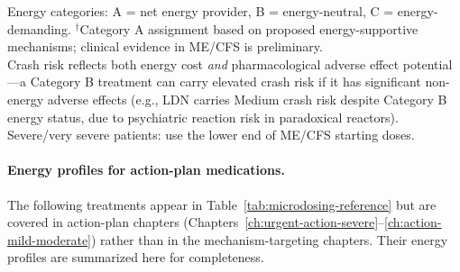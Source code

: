 \begin{table}[htbp]
\medskip
\footnotesize
Energy categories: A = net energy provider, B = energy-neutral, C = energy-demanding. $^\dagger$Category A assignment based on proposed energy-supportive mechanisms; clinical evidence in ME/CFS is preliminary. \\
Crash risk reflects both energy cost \emph{and} pharmacological adverse effect potential---a Category B treatment can carry elevated crash risk if it has significant non-energy adverse effects (e.g., LDN carries Medium crash risk despite Category B energy status, due to psychiatric reaction risk in paradoxical reactors). \\
Severe/very severe patients: use the lower end of ME/CFS starting doses.
\end{table}

\paragraph{Energy profiles for action-plan medications.}
The following treatments appear in Table~\ref{tab:microdosing-reference} but are covered in action-plan chapters (Chapters~\ref{ch:urgent-action-severe}--\ref{ch:action-mild-moderate}) rather than in the mechanism-targeting chapters. Their energy profiles are summarized here for completeness.

